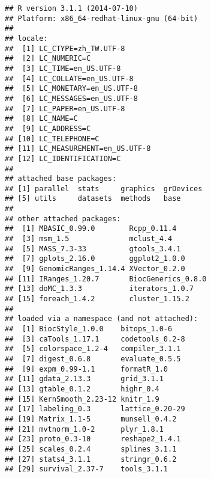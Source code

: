 \documentclass[a4paper,10pt]{article}\usepackage[]{graphicx}\usepackage[]{color}
\makeatletter
\newenvironment{kframe}{%
 \def\at@end@of@kframe{}%
 \ifinner\ifhmode%
  \def\at@end@of@kframe{\end{minipage}}%
  \begin{minipage}{\columnwidth}%
 \fi\fi%
 \def\FrameCommand##1{\hskip\@totalleftmargin \hskip-\fboxsep
 \colorbox{shadecolor}{##1}\hskip-\fboxsep
     \hskip-\linewidth \hskip-\@totalleftmargin \hskip\columnwidth}%
 \MakeFramed {\advance\hsize-\width
   \@totalleftmargin\z@ \linewidth\hsize
   \@setminipage}}%
 {\par\unskip\endMakeFramed%
 \at@end@of@kframe}
\newenvironment{knitrout}{}{} %
\makeatother
\begin{document}
\begin{knitrout}
\color{fgcolor}\begin{kframe}
\begin{verbatim}
## R version 3.1.1 (2014-07-10)
## Platform: x86_64-redhat-linux-gnu (64-bit)
## 
## locale:
##  [1] LC_CTYPE=zh_TW.UTF-8      
##  [2] LC_NUMERIC=C              
##  [3] LC_TIME=en_US.UTF-8       
##  [4] LC_COLLATE=en_US.UTF-8    
##  [5] LC_MONETARY=en_US.UTF-8   
##  [6] LC_MESSAGES=en_US.UTF-8   
##  [7] LC_PAPER=en_US.UTF-8      
##  [8] LC_NAME=C                 
##  [9] LC_ADDRESS=C              
## [10] LC_TELEPHONE=C            
## [11] LC_MEASUREMENT=en_US.UTF-8
## [12] LC_IDENTIFICATION=C       
## 
## attached base packages:
## [1] parallel  stats     graphics  grDevices
## [5] utils     datasets  methods   base     
## 
## other attached packages:
##  [1] MBASIC_0.99.0        Rcpp_0.11.4         
##  [3] msm_1.5              mclust_4.4          
##  [5] MASS_7.3-33          gtools_3.4.1        
##  [7] gplots_2.16.0        ggplot2_1.0.0       
##  [9] GenomicRanges_1.14.4 XVector_0.2.0       
## [11] IRanges_1.20.7       BiocGenerics_0.8.0  
## [13] doMC_1.3.3           iterators_1.0.7     
## [15] foreach_1.4.2        cluster_1.15.2      
## 
## loaded via a namespace (and not attached):
##  [1] BiocStyle_1.0.0    bitops_1.0-6      
##  [3] caTools_1.17.1     codetools_0.2-8   
##  [5] colorspace_1.2-4   compiler_3.1.1    
##  [7] digest_0.6.8       evaluate_0.5.5    
##  [9] expm_0.99-1.1      formatR_1.0       
## [11] gdata_2.13.3       grid_3.1.1        
## [13] gtable_0.1.2       highr_0.4         
## [15] KernSmooth_2.23-12 knitr_1.9         
## [17] labeling_0.3       lattice_0.20-29   
## [19] Matrix_1.1-5       munsell_0.4.2     
## [21] mvtnorm_1.0-2      plyr_1.8.1        
## [23] proto_0.3-10       reshape2_1.4.1    
## [25] scales_0.2.4       splines_3.1.1     
## [27] stats4_3.1.1       stringr_0.6.2     
## [29] survival_2.37-7    tools_3.1.1
\end{verbatim}
\end{kframe}
\end{knitrout}






\end{document}
